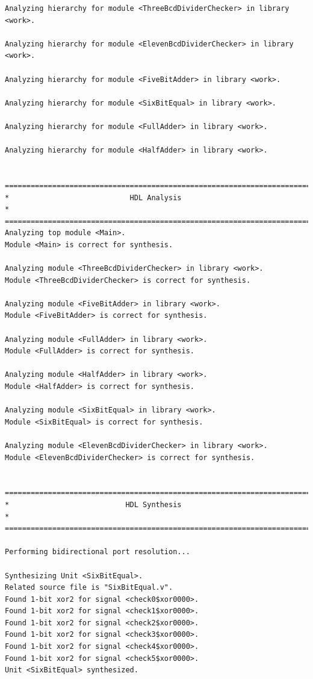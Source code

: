 \documentclass[fleqn]{article}
\begin{document}
\begin{latin}
\begin{lstlisting}[basicstyle=\tiny]
Analyzing hierarchy for module <ThreeBcdDividerChecker> in library <work>.

Analyzing hierarchy for module <ElevenBcdDividerChecker> in library <work>.

Analyzing hierarchy for module <FiveBitAdder> in library <work>.

Analyzing hierarchy for module <SixBitEqual> in library <work>.

Analyzing hierarchy for module <FullAdder> in library <work>.

Analyzing hierarchy for module <HalfAdder> in library <work>.


=========================================================================
*                            HDL Analysis                               *
=========================================================================
Analyzing top module <Main>.
Module <Main> is correct for synthesis.

Analyzing module <ThreeBcdDividerChecker> in library <work>.
Module <ThreeBcdDividerChecker> is correct for synthesis.

Analyzing module <FiveBitAdder> in library <work>.
Module <FiveBitAdder> is correct for synthesis.

Analyzing module <FullAdder> in library <work>.
Module <FullAdder> is correct for synthesis.

Analyzing module <HalfAdder> in library <work>.
Module <HalfAdder> is correct for synthesis.

Analyzing module <SixBitEqual> in library <work>.
Module <SixBitEqual> is correct for synthesis.

Analyzing module <ElevenBcdDividerChecker> in library <work>.
Module <ElevenBcdDividerChecker> is correct for synthesis.


=========================================================================
*                           HDL Synthesis                               *
=========================================================================

Performing bidirectional port resolution...

Synthesizing Unit <SixBitEqual>.
Related source file is "SixBitEqual.v".
Found 1-bit xor2 for signal <check0$xor0000>.
Found 1-bit xor2 for signal <check1$xor0000>.
Found 1-bit xor2 for signal <check2$xor0000>.
Found 1-bit xor2 for signal <check3$xor0000>.
Found 1-bit xor2 for signal <check4$xor0000>.
Found 1-bit xor2 for signal <check5$xor0000>.
Unit <SixBitEqual> synthesized.



\end{lstlisting}
\end{latin}
\end{document}
